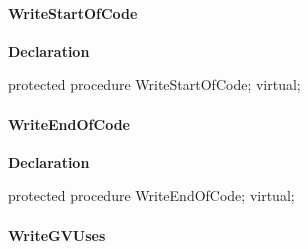 \documentclass{report}
\newif\ifpdf
\begin{document}
\paragraph*{WriteStartOfCode}\hspace*{\fill}

\label{PasDoc_Gen.TDocGenerator-WriteStartOfCode}
\begin{list}{}{
\setlength{\itemindent}{0cm}
\setlength{\listparindent}{0cm}
\setlength{\leftmargin}{\evensidemargin}
\addtolength{\leftmargin}{\tmplength}
\settowidth{\labelsep}{X}
\addtolength{\leftmargin}{\labelsep}
\setlength{\labelwidth}{\tmplength}
}
\item[\textbf{Declaration}\hfill]
\ifpdf
\begin{flushleft}
\fi
\begin{ttfamily}
protected procedure WriteStartOfCode; virtual;\end{ttfamily}

\ifpdf
\end{flushleft}
\fi

\end{list}
\paragraph*{WriteEndOfCode}\hspace*{\fill}

\label{PasDoc_Gen.TDocGenerator-WriteEndOfCode}
\begin{list}{}{
\setlength{\itemindent}{0cm}
\setlength{\listparindent}{0cm}
\setlength{\leftmargin}{\evensidemargin}
\addtolength{\leftmargin}{\tmplength}
\settowidth{\labelsep}{X}
\addtolength{\leftmargin}{\labelsep}
\setlength{\labelwidth}{\tmplength}
}
\item[\textbf{Declaration}\hfill]
\ifpdf
\begin{flushleft}
\fi
\begin{ttfamily}
protected procedure WriteEndOfCode; virtual;\end{ttfamily}

\ifpdf
\end{flushleft}
\fi

\end{list}
\paragraph*{WriteGVUses}\hspace*{\fill}
\end{document}
